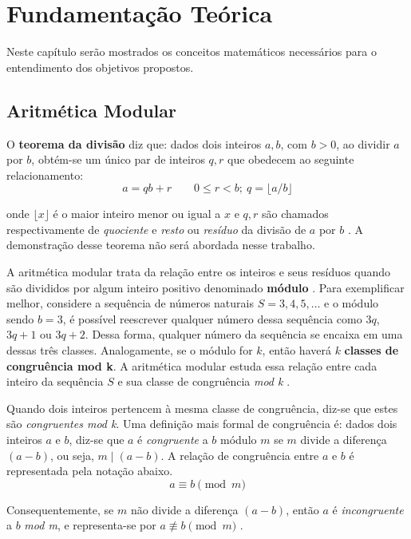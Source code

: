 \chapter{Fundamentação Teórica}
Neste capítulo serão mostrados os conceitos matemáticos necessários para o entendimento dos objetivos propostos.

%
%
\section{Aritmética Modular}

O \textbf{teorema da divisão} diz que: dados dois inteiros $a, b$, com $b > 0$, ao dividir \(a\) por \(b\), obtém-se um único par de inteiros $q, r$ que obedecem ao seguinte relacionamento:
\begin{equation}
  a=qb+r \qquad 0 \leq r<b;\ q=\lfloor a/b \rfloor
\end{equation}

onde $\lfloor x \rfloor$ é o maior inteiro menor ou igual a \(x\) e $q,r$ são chamados respectivamente de \textit{quociente} e \textit{resto} ou \textit{resíduo} da divisão de $a$ por $b$ \cite{Santos:2014}. A demonstração desse teorema não será abordada nesse trabalho.

A aritmética modular trata da relação entre os inteiros e seus resíduos quando são divididos por algum inteiro positivo denominado \textbf{módulo} \cite{Lewinter:2015}. Para exemplificar melhor, considere a sequência de números naturais $S = 3, 4, 5, \dots$ e o módulo sendo $b = 3$, é possível reescrever qualquer número dessa sequência como $3q$, $3q + 1$ ou $3q + 2$. Dessa forma, qualquer número da sequência se encaixa em uma dessas três classes. Analogamente, se o módulo for $k$, então haverá $k$ \textbf{classes de congruência mod k}. A aritmética modular estuda essa relação entre cada inteiro da sequência $S$ e sua classe de congruência \textit{mod k} \cite{Lewinter:2015}.

Quando dois inteiros pertencem à mesma classe de congruência, diz-se que estes são \textit{congruentes mod k}. Uma definição mais formal de congruência é: dados dois inteiros $a$ e $b$, diz-se que $a$ é \textit{congruente} a $b$ módulo $m$ se $m$ divide a diferença $(a-b)$, ou seja, $m \mid (a-b)$. A relação de congruência entre $a$ e $b$ é representada pela notação abaixo.
\begin{equation}
  a \equiv b \pmod m \label{eq:1}
\end{equation}

Consequentemente, se $m$ não divide a diferença $(a - b)$, então $a$ é \textit{incongruente} a $b$ \textit{mod m}, e representa-se por $a \not\equiv b \pmod m$ \cite{Santos:2014}.

